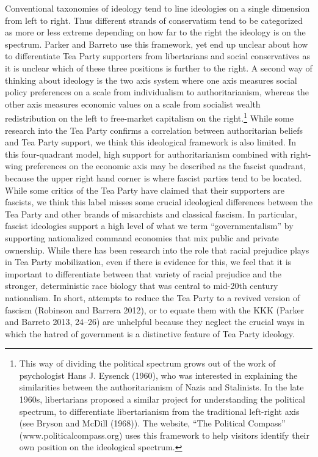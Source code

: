 \documentclass[12pt,]{article}
\begin{document}
Conventional taxonomies of ideology tend to line ideologies on a single
dimension from left to right. Thus different strands of conservatism
tend to be categorized as more or less extreme depending on how far to
the right the ideology is on the spectrum. Parker and Barreto use this
framework, yet end up unclear about how to differentiate Tea Party
supporters from libertarians and social conservatives as it is unclear
which of these three positions is further to the right. A second way of
thinking about ideology is the two axis system where one axis measures
social policy preferences on a scale from individualism to
authoritarianism, whereas the other axis measures economic values on a
scale from socialist wealth redistribution on the left to free-market
capitalism on the right.\footnote{This way of dividing the political
  spectrum grows out of the work of psychologist Hans J. Eysenck (1960), who was interested in explaining the similarities
  between the authoritarianism of Nazis and Stalinists. In the late
  1960s, libertarians proposed a similar project for understanding the
  political spectrum, to differentiate libertarianism from the
  traditional left-right axis (see Bryson and McDill (1968)). The website, ``The Political Compass''
  (www.politicalcompass.org) uses this framework to help visitors
  identify their own position on the ideological spectrum.} While some
research into the Tea Party confirms a correlation between authoritarian
beliefs and Tea Party support, we think this ideological framework is
also limited. In this four-quadrant model, high support for
authoritarianism combined with right-wing preferences on the economic
axis may be described as the fascist quadrant, because the upper right
hand corner is where fascist parties tend to be located. While some
critics of the Tea Party have claimed that their supporters are
fascists, we think this label misses some crucial ideological
differences between the Tea Party and other brands of misarchists and
classical fascism. In particular, fascist ideologies support a high
level of what we term ``governmentalism'' by supporting nationalized
command economies that mix public and private ownership. While there has
been research into the role that racial prejudice plays in Tea Party
mobilization, even if there is evidence for this, we feel that it is
important to differentiate between that variety of racial prejudice and
the stronger, deterministic race biology that was central to mid-20th
century nationalism. In short, attempts to reduce the Tea Party to a
revived version of fascism (Robinson and Barrera 2012), or to equate
them with the KKK (Parker and Barreto 2013, 24--26) are unhelpful
because they neglect the crucial ways in which the hatred of government
is a distinctive feature of Tea Party ideology.
\end{document}
